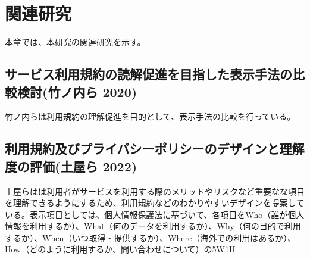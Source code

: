 \chapter{関連研究}
\label{related}

本章では、本研究の関連研究を示す。

\section{サービス利用規約の読解促進を目指した表示手法の比較検討(竹ノ内ら 2020)}
竹ノ内ら\cite{竹ノ内2020}は利用規約の理解促進を目的として、表示手法の比較を行っている。

\section{利用規約及びプライバシーポリシーのデザインと理解度の評価(土屋ら 2022)}
土屋らは\cite{土屋2022}は利用者がサービスを利用する際のメリットやリスクなど重要なな項目を理解できるようにするため、利用規約などのわかりやすいデザインを提案している。表示項目としては、個人情報保護法に基づいて、各項目をWho（誰が個人情報を利用するか）、What（何のデータを利用するか）、Why（何の目的で利用するか）、When（いつ取得・提供するか）、Where（海外での利用はあるか）、How（どのように利用するか、問い合わせについて）の5W1H